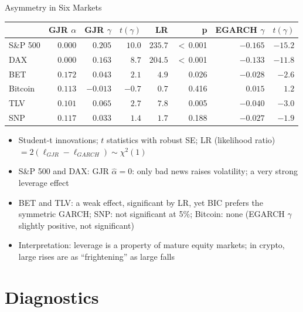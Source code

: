 \begin{frame}{Asymmetry in Six Markets}
\itemsize{\footnotesize}
\begin{center}
\scriptsize
\begin{tabular}{lrrrrrrr}
\toprule
& GJR $\alpha$ & GJR $\gamma$ & $t(\gamma)$ & LR & p & EGARCH $\gamma$ & $t(\gamma)$ \\
\midrule
S\&P 500 & $0.000$ & $0.205$ & $10.0$ & $235.7$ & $<$\,0.001 & ${-0.165}$ & ${-15.2}$ \\
DAX & $0.000$ & $0.163$ & $8.7$ & $204.5$ & $<$\,0.001 & ${-0.133}$ & ${-11.8}$ \\
BET & $0.172$ & $0.043$ & $2.1$ & $4.9$ & 0.026 & ${-0.028}$ & ${-2.6}$ \\
Bitcoin & $0.113$ & $-0.013$ & $-0.7$ & $0.7$ & 0.416 & ${0.015}$ & ${1.2}$ \\
TLV & $0.101$ & $0.065$ & $2.7$ & $7.8$ & 0.005 & ${-0.040}$ & ${-3.0}$ \\
SNP & $0.117$ & $0.033$ & $1.4$ & $1.7$ & 0.188 & ${-0.027}$ & ${-1.9}$ \\
\bottomrule
\end{tabular}
\end{center}
\begin{itemize}
    \item Student-t innovations; $t$ statistics with robust SE; LR (likelihood ratio) $= 2(\ell_{GJR} - \ell_{GARCH}) \sim \chi^2(1)$
    \item S\&P 500 and DAX: GJR $\hat\alpha = 0$: only bad news raises volatility; a very strong leverage effect
    \item BET and TLV: a weak effect, significant by LR, yet BIC prefers the symmetric GARCH; SNP: not significant at 5\%; Bitcoin: none (EGARCH $\gamma$ slightly positive, not significant)
    \item Interpretation: leverage is a property of mature equity markets; in crypto, large rises are as ``frightening'' as large falls
\end{itemize}
\end{frame}


\section{Diagnostics}

